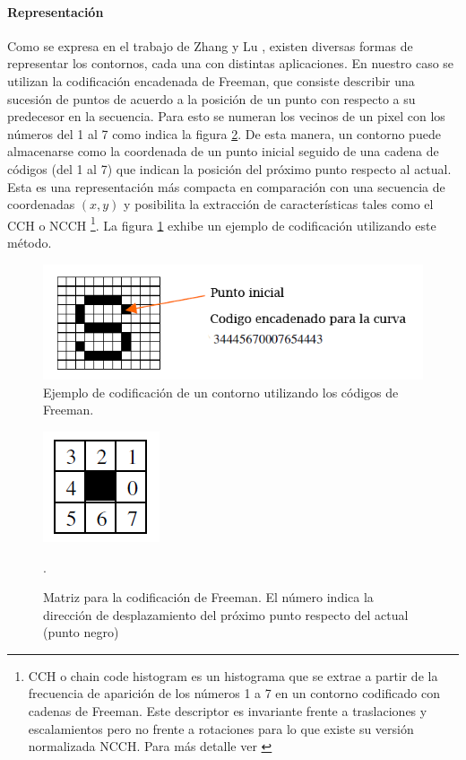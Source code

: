 	\paragraph{Representación}
	Como se expresa en el trabajo de Zhang y Lu \cite{Zhang02}, existen diversas formas de representar los contornos, cada una con
	distintas aplicaciones. En nuestro caso se utilizan la codificación encadenada de Freeman, que consiste describir una sucesión de puntos
	de acuerdo a la posición de un punto con respecto a su predecesor en la secuencia. Para esto se numeran los vecinos de un pixel con 
	los números del 1 al 7 como indica la figura \ref{fig:freeman}. De esta manera, un contorno puede almacenarse como la coordenada de
	un punto inicial seguido de una cadena de códigos (del 1 al 7) que indican la posición del próximo punto respecto al actual. Esta 
	es una representación más compacta en comparación con una secuencia 
	de coordenadas  $(x,y)$ y posibilita la extracción de 
	características tales como el CCH o NCCH \footnote{ CCH o chain 
	code histogram es un histograma que se extrae a partir de la 
	frecuencia de aparición de los números 1 a 7 en un contorno 
	codificado con cadenas de Freeman. Este descriptor es invariante 
	frente a traslaciones y escalamientos pero no frente a rotaciones 
	para lo que existe su versión normalizada NCCH. Para más detalle 
	ver \cite{Iivarinen96shaperecognition}}. La figura \ref{fig:freeman_sample} exhibe un 
	ejemplo de codificación utilizando este método.
	
	\begin{figure}[htpb]
\begin{center}
  \includegraphics[scale=0.6]{figuras/freeman-sample.png}
\end{center}	
  \caption{\small Ejemplo de codificación de un contorno utilizando los códigos de Freeman. }
  \label{fig:freeman_sample}
\end{figure}

\begin{figure}[htpb]
\begin{center}
  \includegraphics[scale=0.6]{figuras/freeman-codes.png}
\end{center}
  \caption{\small Matriz para la codificación de Freeman. El número indica la dirección de desplazamiento del próximo punto respecto del
  actual (punto negro) }.
  \label{fig:freeman}
\end{figure}
		
